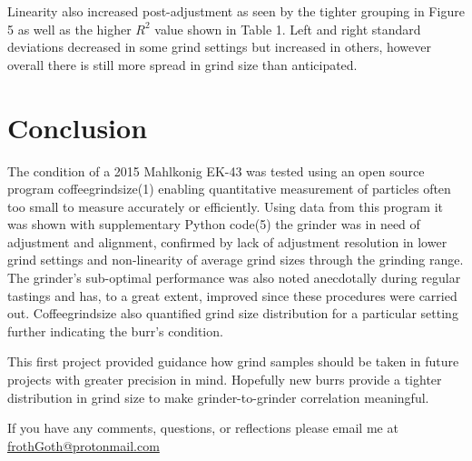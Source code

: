 \documentclass[10pt,a4paper,twocolumn,notitlepage]{article}
\begin{document}
Linearity also increased post-adjustment as seen by the tighter grouping in Figure 5 as well as the higher $R^2$ value shown in Table 1. Left and right standard deviations decreased in some grind settings but increased in others, however overall there is still more spread in grind size than anticipated. \\

\section{Conclusion}

The condition of a 2015 Mahlkonig EK-43 was tested using an open source program coffeegrindsize(1) enabling quantitative measurement of particles often too small to measure accurately or efficiently. Using data from this program it was shown with supplementary Python code(5) the grinder was in need of adjustment and alignment, confirmed by lack of adjustment resolution in lower grind settings and non-linearity of average grind sizes through the grinding range. The grinder's sub-optimal performance was also noted anecdotally during regular tastings and has, to a great extent, improved since these procedures were carried out. Coffeegrindsize also quantified grind size distribution for a particular setting further indicating the burr's condition.

This first project provided guidance how grind samples should be taken in future projects with greater precision in mind. Hopefully new burrs provide a tighter distribution in grind size to make grinder-to-grinder correlation meaningful. 

If you have any comments, questions, or reflections please email me at \url{frothGoth@protonmail.com}
\end{document}
